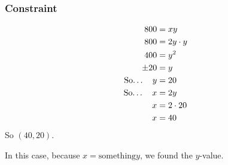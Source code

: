 \documentclass{article}
\begin{document}
\begin{examplebox}
\begin{solutionbox}
        \subsubsection*{Constraint}
        \begin{align*}
            800 &= xy \\
            800 &= 2y \cdot y \\
            400 &= y^2 \\
            \pm 20 &= y \\
            \text{So\dots} \quad y &= 20 \\
            \text{So\dots} \quad x &= 2y \\
            x &= 2 \cdot 20 \\
            x &= 40
        \end{align*}
        So \( (40, 20) \).

        In this case, because \( x = \text{something}y \), we found the \( y \)-value.
    \end{solutionbox}
\end{examplebox}
\end{document}
